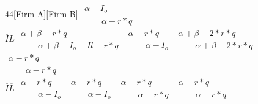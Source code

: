 \documentclass[10.5pt]{article}
\begin{document}
\begin{figure}[ h!]
\begin{center}
\begin{footnotesize}
\begin{game}{4}{4}[Firm A][Firm B]
							  \> $\begin{array}{l}\alpha-I_{o} \\[0.0mm]\phantom{--}\alpha-r*q \end{array}$
							  \\$\overline{I}L$   
							  \> $\begin{array}{l}\alpha+\beta-r*q \\[0.0mm]\phantom{--}\alpha+\beta-I_{o}-I{l}-r*q \end{array}$
							  \> $\begin{array}{l}\alpha-r*q \\[0.0mm]\phantom{--}\alpha-I_{o} \end{array}$ 
							  \> $\begin{array}{l}\alpha+\beta-2*r*q \\[0.0mm]\phantom{--}\alpha+\beta-2*r*q \end{array}$
							  \> $\begin{array}{l}\alpha-r*q \\[0.0mm]\phantom{--}\alpha-r*q \end{array}$
							\\$\overline{I}\overline{L}$ 
							 \> $\begin{array}{l}\alpha-r*q \\[0.0mm]\phantom{--}\alpha-I_{o}\end{array}$
							 \> $\begin{array}{l}\alpha-r*q \\[0.0mm]\phantom{--}\alpha-I_{o}\end{array}$
							 \> $\begin{array}{l}\alpha-r*q \\[0.0mm]\phantom{--}\alpha-r*q \end{array}$
							 \>$\begin{array}{l}\alpha-r*q \\[0.0mm]\phantom{--}\alpha-r*q \end{array}$
							  \\
\end{game}
\end{footnotesize}
\end{center}
\end{figure}
\end{document}
